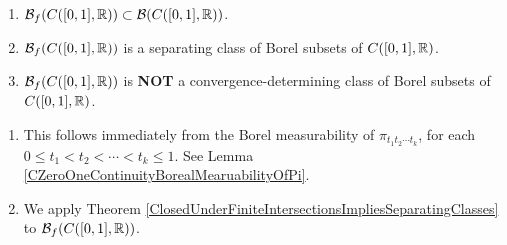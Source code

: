 \begin{theorem}
\mbox{}
\begin{enumerate}
\item	$\mathcal{B}_{f}\!\left(C([0,1],\mathbb{R})\right) \subset \mathcal{B}\!\left(C([0,1],\mathbb{R})\right)$.
\item	$\mathcal{B}_{f}\!\left(C([0,1],\mathbb{R})\right)$ is a separating class of Borel subsets of $C([0,1],\mathbb{R})$.
\item	$\mathcal{B}_{f}\!\left(C([0,1],\mathbb{R})\right)$ is \textbf{\color{red}NOT}
		a convergence-determining class of Borel subsets of $C([0,1],\mathbb{R})$.
\end{enumerate}
\end{theorem}
\proof
\begin{enumerate}
\item
	This follows immediately from the Borel measurability of $\pi_{t_{1}t_{2}\cdots t_{k}}$,
	for each $0 \leq t_{1} < t_{2} < \cdots < t_{k} \leq 1$.
	See Lemma \ref{CZeroOneContinuityBorealMearuabilityOfPi}.
\item
	We apply
	Theorem \ref{ClosedUnderFiniteIntersectionsImpliesSeparatingClasses}
	to $\mathcal{B}_{f}\!\left(C([0,1],\mathbb{R})\right)$.


\end{enumerate}
